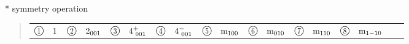 \documentclass[fleqn,10pt,landscape]{jsarticle}
\begin{document}
* symmetry operation
\begin{quote}
\begin{tabular}{llllllllll}
$ {\ooalign{\hfil\resizebox{.8\width}{\height}{1}\hfil\crcr\raise.1ex\hbox{\large$\bigcirc$}}}\quad 1 $ & $ {\ooalign{\hfil\resizebox{.8\width}{\height}{2}\hfil\crcr\raise.1ex\hbox{\large$\bigcirc$}}}\quad 2{}_{001} $ & $ {\ooalign{\hfil\resizebox{.8\width}{\height}{3}\hfil\crcr\raise.1ex\hbox{\large$\bigcirc$}}}\quad 4^{+}_{\,\,001} $ & $ {\ooalign{\hfil\resizebox{.8\width}{\height}{4}\hfil\crcr\raise.1ex\hbox{\large$\bigcirc$}}}\quad 4^{-}_{\,\,001} $ & $ {\ooalign{\hfil\resizebox{.8\width}{\height}{5}\hfil\crcr\raise.1ex\hbox{\large$\bigcirc$}}}\quad {\rm m}_{100} $ & $ {\ooalign{\hfil\resizebox{.8\width}{\height}{6}\hfil\crcr\raise.1ex\hbox{\large$\bigcirc$}}}\quad {\rm m}_{010} $ & $ {\ooalign{\hfil\resizebox{.8\width}{\height}{7}\hfil\crcr\raise.1ex\hbox{\large$\bigcirc$}}}\quad {\rm m}_{110} $ & $ {\ooalign{\hfil\resizebox{.8\width}{\height}{8}\hfil\crcr\raise.1ex\hbox{\large$\bigcirc$}}}\quad {\rm m}_{1-10} $
\end{tabular}
\end{quote}
\end{document}
